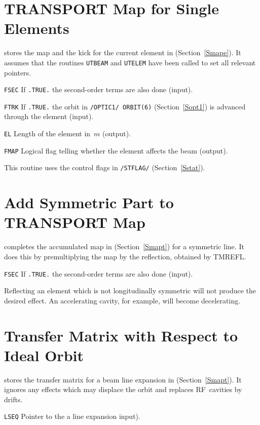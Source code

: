 \section{TRANSPORT Map for Single Elements}
\label{TMMAP}
stores the map and the kick for the current element in 
 (Section~\ref{Smape}).
It assumes that the routines {\tt UTBEAM} and {\tt UTELEM} have been
called to set all relevant pointers.
\begin{mylist}
\item[\tt FSEC]
If {\tt .TRUE.} the second-order terms are also done (input).
\item[\tt FTRK]
If {\tt .TRUE.} the orbit in {\tt /OPTIC1/ ORBIT(6)}
(Section~\ref{Sopt1}) is advanced through the element (input).
\item[\tt EL]
Length of the element in~$m$ (output).
\item[\tt FMAP]
Logical flag telling whether the element affects the beam (output).
\end{mylist}
This routine uses the control flags in {\tt /STFLAG/}
(Section~\ref{Sstat}). 

\section{Add Symmetric Part to TRANSPORT Map}
\label{TMMKSM}
completes the accumulated map in  
(Section~\ref{Smapt}) for a symmetric line.
It does this by premultiplying the map by the reflection, 
obtained by TMREFL.
\begin{mylist}
\item[\tt FSEC]
If {\tt .TRUE.} the second-order terms are also done (input).
\end{mylist}
Reflecting an element which is not longitudinally symmetric 
will not produce the desired effect. 
An accelerating cavity, for example, will become decelerating.

\section{Transfer Matrix with Respect to Ideal Orbit}
\label{TMREFE}
stores the transfer matrix for a beam line expansion 
in  (Section~\ref{Smapt}).
It ignores any effects which may displace the orbit
and replaces RF~cavities by drifts.
\begin{mylist}
\item[\tt LSEQ]
Pointer to the a line expansion input).
\end{mylist}

